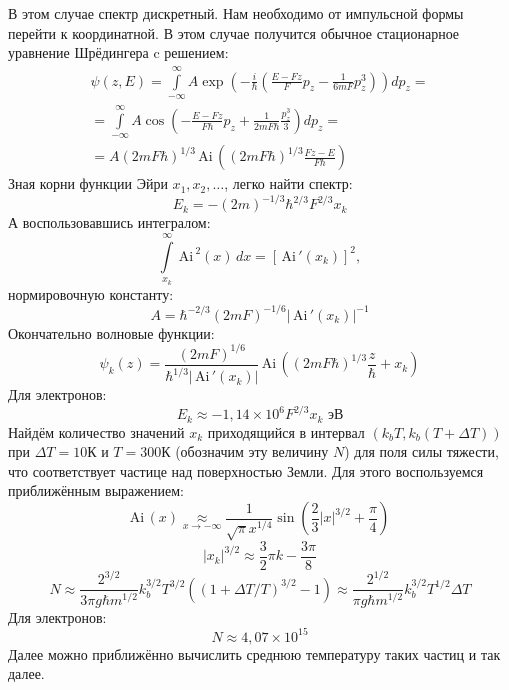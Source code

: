 \parbox{\textwidth}{
	\centering
{}
}
В этом случае спектр дискретный. Нам необходимо от импульсной формы перейти к координатной. В этом случае получится обычное стационарное уравнение Шрёдингера c решением:
\[
	\begin{gathered}
	\psi(z, E) = \int\limits_{-\infty}^{\infty} 
	A \exp \left(-\frac{i}{\hbar} \left( \frac{E - Fz}{F} p_z - \frac{1}{6 m F} p_z^3 \right) \right) dp_z = \\ =
	\int\limits_{-\infty}^{\infty} 
	A \cos \left( -\frac{E - Fz}{F \hbar} p_z + \frac{1}{2 m F \hbar} \frac{p_z^3}{3} \right) dp_z
	= \\ =
	A (2 m F \hbar)^{1/3} \mathrm{\,Ai\,} \left((2 m F \hbar)^{1/3}\frac{Fz - E}{F \hbar}\right)	
	\end{gathered}
\]
Зная корни функции Эйри $x_1, x_2, \ldots$, легко найти спектр:
\[
	E_k = - (2 m)^{-1/3} \hbar^{2/3} F^{2/3} x_k
\]
А воспользовавшись интегралом:
\[
	\int\limits_{x_k}^{\infty} \mathrm{\,Ai\,}^2 (x)\,dx = \left[\mathrm{\,Ai\,}' (x_k)\right]^2,
\]
нормировочную константу:
\[
	A = \hbar^{-2/3} (2 m F)^{-1/6} |\mathrm{\,Ai\,}' (x_k)|^{-1}
\]
Окончательно волновые функции:
\[
	\psi_k(z) = \frac{(2mF)^{1/6}}{\hbar^{1/3}|\mathrm{\,Ai\,}' (x_k)|} \mathrm{\,Ai\,} \left((2 m F \hbar)^{1/3} \frac{z}{\hbar} + x_k \right)
\]
Для электронов:
\[
	E_k \approx -1{,}14\times10^{6} F^{2/3} x_k \text{ эВ}
\]
Найдём количество значений $x_k$ приходящийся в интервал $(k_{b}T, k_{b}(T + \Delta T))$ при $\Delta T= 10 $К и $T = 300 $К (обозначим эту величину $N$) для поля силы тяжести, что соответствует частице над поверхностью Земли. Для этого воспользуемся приближённым выражением:
\[
	\mathrm{Ai\,}(x) \underset{x \to -\infty}{\approx} \frac{1}{\sqrt{\pi} x^{1/4}} \sin \left( \frac{2}{3} |x|^{3/2} + \frac{\pi}{4}\right)
\]
\[
	|x_k|^{3/2} \approx \frac{3}{2}\pi k - \frac{3\pi}{8}
\]
\[
	N \approx \frac{2^{3/2}}{3\pi g \hbar m^{1/2}} k_{b}^{3/2} T^{3/2} ((1 + \Delta T/T)^{3/2} - 1) \approx 
	\frac{2^{1/2}}{\pi g \hbar m^{1/2}} k_{b}^{3/2} T^{1/2} \Delta T
\]
Для электронов:
\[
	N \approx 4{,}07\times10^{15}
\]
Далее можно приближённо вычислить среднюю температуру таких частиц и так далее.